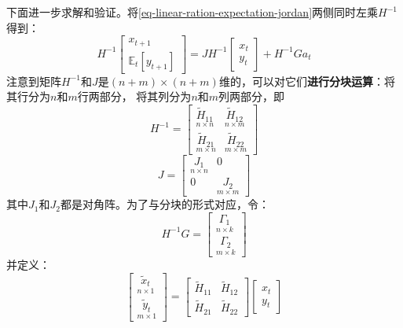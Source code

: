 下面进一步求解和验证。将\cref{eq-linear-ration-expectation-jordan}两侧同时左乘$H^{-1}$得到：
\begin{equation}    \label{eq-linear-ration-expectation-jordan-invH}
    H^{-1}
    \begin{bmatrix}
        x_{t+1} \\
        \mathbb{E}_t\left[y_{t+1}\right]
    \end{bmatrix}
    =
    JH^{-1}
    \begin{bmatrix}
        x_t \\
        y_t
    \end{bmatrix}
    +
    H^{-1}Ga_t
\end{equation}
注意到矩阵$H^{-1}$和$J$是$(n+m)\times (n+m)$维的，可以对它们\textbf{进行分块运算}：将其行分为$n$和$m$行两部分，
将其列分为$n$和$m$列两部分，即
\[
    H^{-1} =
    \begin{bmatrix}
       \underset{n\times n}{\tilde{H}_{11}} & \underset{n\times m}{\tilde{H}_{12}} \\
       \underset{m\times n}{\tilde{H}_{21}} & \underset{m\times m}{\tilde{H}_{22}}
    \end{bmatrix}
\]
\[
    J = 
    \begin{bmatrix}
       \underset{n\times n}{J_1} & 0 \\
       0 & \underset{m\times m}{J_2} 
    \end{bmatrix}
\]
其中$J_1$和$J_2$都是对角阵。为了与分块的形式对应，令：
\[
    H^{-1}G = 
    \begin{bmatrix}
        \underset{n\times k}{\Gamma_1} \\
        \underset{m\times k}{\Gamma_2}
    \end{bmatrix}
\]
并定义：
\begin{equation}    \label{eq-linear-ration-expectation-def-tilde}
    \begin{bmatrix}
        \underset{n\times 1}{\tilde{x}_t} \\
        \underset{m\times 1}{\tilde{y}_t}
    \end{bmatrix}
    =
    \begin{bmatrix}
        \tilde{H}_{11} & \tilde{H}_{12} \\
        \tilde{H}_{21} & \tilde{H}_{22}
    \end{bmatrix}
    \begin{bmatrix}
        x_t \\
        y_t 
    \end{bmatrix}
\end{equation}
